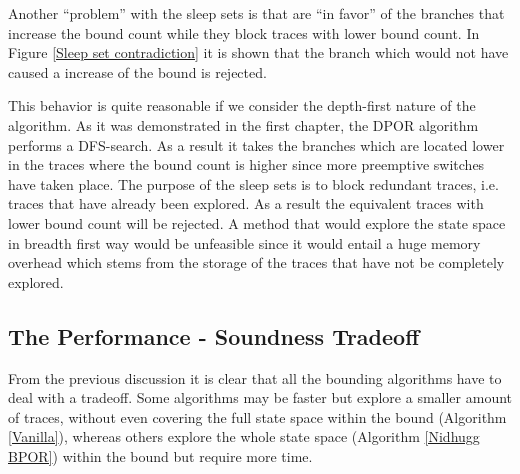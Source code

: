 Another ``problem'' with the sleep sets is that are ``in favor'' of the branches that increase the bound count while
they block traces with lower bound count. In Figure \ref{Sleep set contradiction} it is shown that the branch which
would not have caused a increase of the bound is rejected.


This behavior is quite reasonable if we consider the depth-first nature of the algorithm. As it was demonstrated in the
first chapter, the DPOR algorithm performs a DFS-search. As a result it takes the branches which are located lower in
the traces where the bound count is higher since more preemptive switches have taken place. The purpose of the sleep
sets is to block redundant traces, i.e. traces that have already been explored. As a result the equivalent traces with
lower bound count will be rejected. A method that would explore the state space in breadth first way would be unfeasible
since it would entail a huge memory overhead which stems from the storage of the traces that have not be completely
explored. 

\iffalse
\subsection{Source Sets - Optimal DPOR}
The source set technique which can lead many times to optimal coverage of the state space manages avoid the exploration
of redundant sets. However as it was discussed in the previous section it avoids the scheduling of the traces.
Unfortunately it cannot be used in the when conservative branches are added since these branches are not related to the
sleep sets. As a result the conservative branches alone will never lead to sleep set blocked traces.

However, in many test cases there are some sleep set blocked traces which are caused by conditional reads and writes.
When a technique which does not utilize the sleep sets is to be used these traces would have been easily eliminated.
Unfortunately, it was experimentally shown that explored traces outnumber the sleepset blocked traces and, consequently,
the implementation of such an algorithm would have a minor impact.

Moreover, we have shown that even if we maintain the source-set optimization for the non-conservative branches the
results will be equivalent with using persistent sets. The idea of keeping the rejected traces from Source-DPOR that
would have been added from DPOR (with persistent sets) was rejected since it harms the soundness of the algorithm.
\fi

\subsection {The Performance - Soundness Tradeoff}

From the previous discussion it is clear that all the bounding algorithms have to deal with a tradeoff. Some algorithms may be faster but
explore a smaller amount of traces, without even covering the full state space within the bound (Algorithm \ref{Vanilla}), 
whereas others explore the whole state space (Algorithm \ref{Nidhugg BPOR}) within the bound but require more time.
